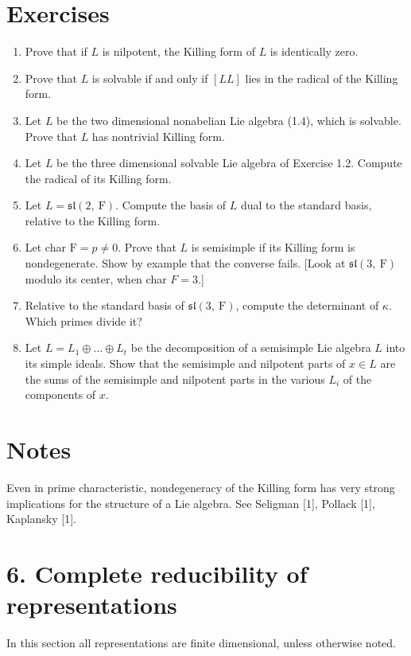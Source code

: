 \documentclass[10pt]{article}
\begin{document}
\section*{Exercises}
\begin{enumerate}
  \item Prove that if $L$ is nilpotent, the Killing form of $L$ is identically zero.
  \item Prove that $L$ is solvable if and only if $[L L]$ lies in the radical of the Killing form.
  \item Let $L$ be the two dimensional nonabelian Lie algebra (1.4), which is solvable. Prove that $L$ has nontrivial Killing form.
  \item Let $L$ be the three dimensional solvable Lie algebra of Exercise 1.2. Compute the radical of its Killing form.
  \item Let $L=\mathfrak{s l}(2, \mathrm{~F})$. Compute the basis of $L$ dual to the standard basis, relative to the Killing form.
  \item Let char $\mathrm{F}=p \neq 0$. Prove that $L$ is semisimple if its Killing form is nondegenerate. Show by example that the converse fails. [Look at $\mathfrak{s l}(3, \mathrm{~F})$ modulo its center, when char $F=3$.]
  \item Relative to the standard basis of $\mathfrak{s l}(3, \mathrm{~F})$, compute the determinant of $\kappa$. Which primes divide it?
  \item Let $L=L_{1} \oplus \ldots \oplus L_{t}$ be the decomposition of a semisimple Lie algebra $L$ into its simple ideals. Show that the semisimple and nilpotent parts of $x \in L$ are the sums of the semisimple and nilpotent parts in the various $L_{i}$ of the components of $x$.
\end{enumerate}

\section*{Notes}
Even in prime characteristic, nondegeneracy of the Killing form has very strong implications for the structure of a Lie algebra. See Seligman [1], Pollack [1], Kaplansky [1].

\section*{6. Complete reducibility of representations}
In this section all representations are finite dimensional, unless otherwise noted.
\end{document}
